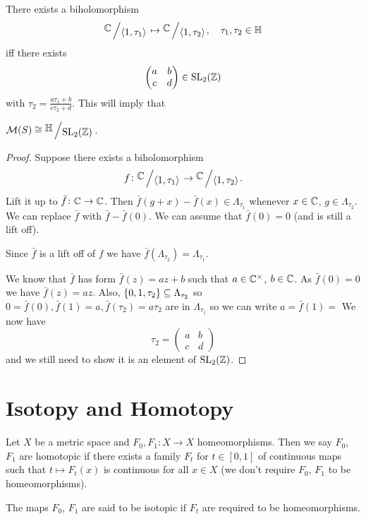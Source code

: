 \documentclass[11pt,a4paper]{article}
\renewcommand{\H}{\mathbb H}
\begin{document}
\begin{theorem}
There exists a biholomorphism
\[
  \bigslant{\C}{\ip{1}{\tau_1}} \mapsto
  \bigslant{\C}{\ip{1}{\tau_2}}, \quad \tau_1,\tau_2 \in \H
\]
iff there exists 
\[
  \begin{pmatrix}
    a & b \\
    c & d
  \end{pmatrix} \in \mathrm{SL}_2(\mathbb{Z})
\]
with $\tau_2= \frac{a \tau_1 + b}{c \tau_2 + d}$.
This will imply that \item $\M(S) \cong \bigslant{\H}{\SL_2(\Z)}$.
\end{theorem}
\begin{proof}
  Suppose there exists a biholomorphism 
  \[
    f \colon \bigslant{\C}{\ip{1}{\tau_1}} \to
    \bigslant{\C}{\ip{1}{\tau_2}}.
  \]
  Lift it up to $\bar f \colon \mathbb{C} \to \mathbb{C}$.
  Then $\bar f(g + x) - \bar f(x) \in \Lambda_{\tau_1}$
  whenever $x \in \mathbb{C}$, $g \in \Lambda_{\tau_2}$.
  We can replace $\bar f$ with $\bar f - \bar f(0)$.
  We can assume that $\bar f(0) = 0$ (and is still a lift off).
  \begin{remark}
    Since $\bar f$ is a lift off of $f$ we have 
    $\bar f(\Lambda_{\tau_2}) = \Lambda_{\tau_1}$.
  \end{remark}
  We know that $\bar f$ has form $\bar f(z) = a z + b$ such that
  $a \in \mathbb{C}^{\times}$, $b \in \mathbb{C}$.
  As $\bar f(0) = 0$ we have $\bar f(z) = a z$.
  Also, $\left\{0,1,\tau_2\right\} \subseteq \Lambda_{\tau_2}$ so 
  $0 = \bar f(0), \bar f(1) = a, \bar f(\tau_2) = a \tau_2$ are in
  $\Lambda_{\tau_1}$ so we can write $a = \bar f(1) = $
  We now have
  \[
    \tau_2 =
    \begin{pmatrix}
      a & b \\
      c & d
    \end{pmatrix}
  \]
  and we still need to show it is an element of $\mathrm{SL}_2(\mathbb{Z})$.
\end{proof}


\newpage

\section{Isotopy and Homotopy}
Let $X$ be a metric space and $F_0, F_1 \colon X \to X$ homeomorphisms.
Then we say $F_0$, $F_1$ are homotopic if there exists a family $F_t$
for $t \in [0,1]$ of continuous maps such that $t \mapsto F_t(x)$ is
continuous for all $x \in X$ (we don't require $F_0$, $F_1$ to be 
homeomorphisms).

The maps $F_0$, $F_1$ are said to be isotopic if $F_t$ are required to
be homeomorphisms.
\end{document}
